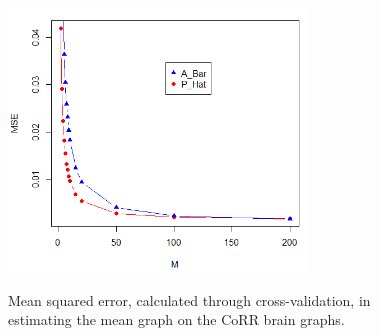 	\begin{figure}[!htb]
		\centering
		\includegraphics[width=8cm]{XV_MSE.PNG}
		\label{fig:plot1}
		\caption{Mean squared error, calculated through cross-validation, in estimating the mean graph on the CoRR brain graphs.}
	\end{figure} 
\newpage